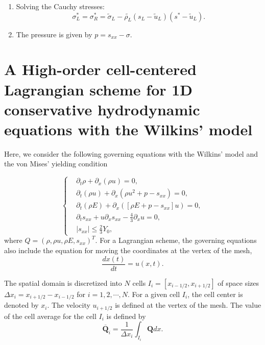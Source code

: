 \documentclass{article}
\numberwithin{equation}{section}
\numberwithin{table}{section}
\begin{document}
\begin{enumerate}
\begin{enumerate}
    \item Solving the Cauchy stresses:
\begin{equation*}
  \sigma_L^*=\sigma_R^*=\widetilde{\sigma}_L -\widetilde{\rho_L} (s_L-\widetilde{u}_L)(s^*-\widetilde{u}_L).
\end{equation*}

     \item The pressure is given by $p =s_{xx}-\sigma$.
  \end{enumerate}
\end{enumerate}

 \section{ A High-order cell-centered Lagrangian scheme for 1D  conservative hydrodynamic equations with the Wilkins' model}
Here, we consider the following governing equations with the  Wilkins' model  and  the von Mises' yielding condition

\begin{equation}\label{eq:gveq}
   \left\{ \begin{aligned}
	   & \partial _t \rho +\partial_x(\rho u)=0,\\
	   & \partial _t (\rho u)+\partial_x(\rho u^2 + p -s_{xx})=0,\\
	   &\partial _t (\rho E)+\partial_x([\rho E + p -s_{xx}]u)=0,\\
	   &\partial _t s_{xx}+u\partial_xs_{xx}-\frac{4}{3}\partial_x u=0,\\
& |s_{xx}|\leq\frac{2}{3}Y_{0},
	   \end{aligned}\right.
\end{equation}
where $Q = (\rho, \rho u, \rho E, s_{xx})^T$.  For a Lagrangian scheme, the governing equations also include the equation for moving the coordinates at the vertex of the mesh,
\begin{equation}\label{eq:dxt}
  \frac{dx(t)}{dt} = u(x,t).
\end{equation}

The spatial domain is discretized into $N$ cells $I_i = [x_{i-1/2}, x_{i+1/2}]$ of space sizes $\Delta x_i = x_{i+1/2} - x_{i-1/2}$ for $i = 1,2,\cdots,N$. For a given cell $I_i$, the cell center is denoted by $x_i$. The velocity $u_{i+1/2}$ is defined at the vertex of the mesh. The  value of the cell average for the cell $I_i$ is defined by
\begin{equation}
  \overline{\bm{Q}}_i = \frac{1}{\Delta x_i} \int_{I_i} \bm{Q} dx.
\end{equation}
\end{document}
